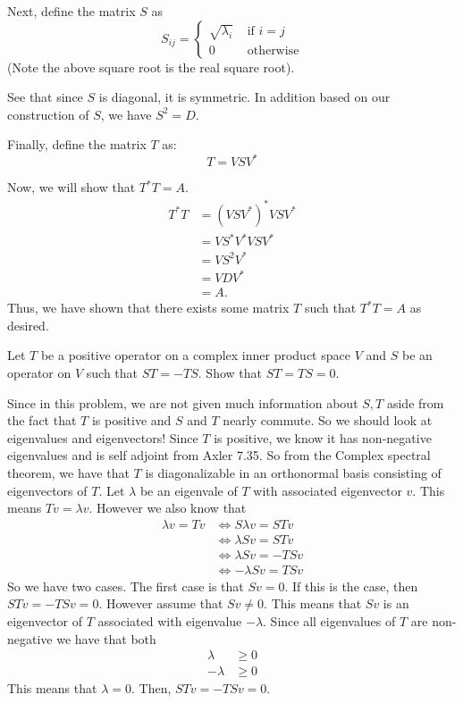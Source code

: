 \documentclass[answers]{exam}
\begin{document}
\begin{questions}
\begin{solution}
        Next, define the matrix $S$ as 
        \[
            S_{ij} = \begin{cases} \sqrt{\lambda_i} & \text{ if }i=j\\
                0   & \text{ otherwise}
            \end{cases}
        \]
        (Note the above square root is the real square root).
        
        See that since $S$ is diagonal, it is symmetric. In addition based on our construction of $S$, we have
        $S^2 = D$.

        Finally, define the matrix $T$ as:
        \[
            T = VSV^*
        \]

        Now, we will show that $T^*T = A$.
        \begin{align*}
            T^*T &= \left(VSV^*\right)^*VSV^* \\
            &= VS^*V^*VSV^*\\
            &= VS^2V^*\\
            &= VDV^* \\
            &= A.
        \end{align*}
        Thus, we have shown that there exists some matrix $T$ such that $T^*T = A$ as desired.
    \end{solution}
    \question Let $T$ be a positive operator on a complex inner product space $V$ and $S$ be an operator on $V$
    such that $ST = -TS$. Show that $ST=TS=0$.
    \begin{solution}
         Since in this problem, we are not given much information about $S,T$ aside from the
        fact that $T$ is positive and $S$ and $T$ nearly commute. So we should look at eigenvalues and 
        eigenvectors! Since $T$ is positive, we know it has non-negative eigenvalues and is self
        adjoint from Axler 7.35. So from the Complex spectral theorem, we have that $T$ is diagonalizable in an
        orthonormal basis consisting of eigenvectors of $T$. Let $\lambda$ be an eigenvale of $T$ with associated
        eigenvector $v$. This means $Tv = \lambda v$. However we also know that
        \begin{align*}
            \lambda v = Tv &\iff S\lambda v = STv\\
            &\iff \lambda Sv = STv \\
            &\iff \lambda Sv = -TSv\\
            &\iff -\lambda Sv = TSv
        \end{align*}
        So we have two cases. The first case is that $Sv = 0$. If this is the case, then $STv = -TSv = 0$.
        However assume that $Sv\neq 0$. This means that $Sv$ is an eigenvector of $T$ associated with eigenvalue
        $-\lambda$. Since all eigenvalues of $T$ are non-negative we have that both
        \begin{align*}
            \lambda &\geq 0 \\
            -\lambda&\geq 0
        \end{align*}
        This means that $\lambda = 0$. Then, $STv = -TSv = 0$.


\end{solution}
\end{questions}
\end{document}

